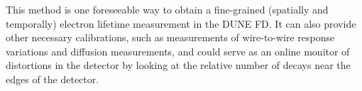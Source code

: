 
This method is one foreseeable way to obtain a fine-grained (spatially and temporally) electron lifetime measurement in the DUNE FD.  It can also provide other necessary calibrations, such as measurements of wire-to-wire response variations and diffusion measurements, 
and could serve as an online monitor of 
\efield distortions in the detector by looking at the relative number of decays 
near the edges of the 
detector.  

